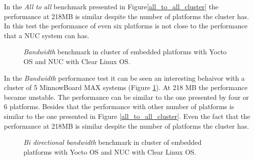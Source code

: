 In the \textit{All to all} benchmark presented in
Figure\ref{all_to_all_cluster} the performance at 218MB is similar despite the
number of platforms the cluster has. In this test the performance of even six
platforms is not close to the performance that a NUC \cite{NUC} system can has.

\begin{figure}[H]
\begin{center}
\end{center}
\caption{\textit{Bandwidth} benchmark in cluster of embedded platforms with Yocto OS and NUC
with Clear Linux OS.}
\label{bandwidth_cluster}
\end{figure}

In the \textit{Bandwidth} performance test it can be seen an interesting
behaivor with a cluster of 5 MinnowBoard MAX systems (Figure
\ref{bandwidth_cluster}). At 218 MB the performance became unstable. The
performance can be similar to the one presented by four or 6 platforms. Besides
that the performance with other number of platforms is similar to the one
presented in Figure \ref{all_to_all_cluster}.  Even the fact that the
performance at 218MB is similar despite the number of platforms the cluster
has.

\begin{figure}[H]
\begin{center}
\end{center}
\caption{\textit{Bi directional bandwidth} benchmark in cluster of embedded platforms with Yocto OS and NUC
with Clear Linux OS.}
\label{bibw_cluster}
\end{figure}

